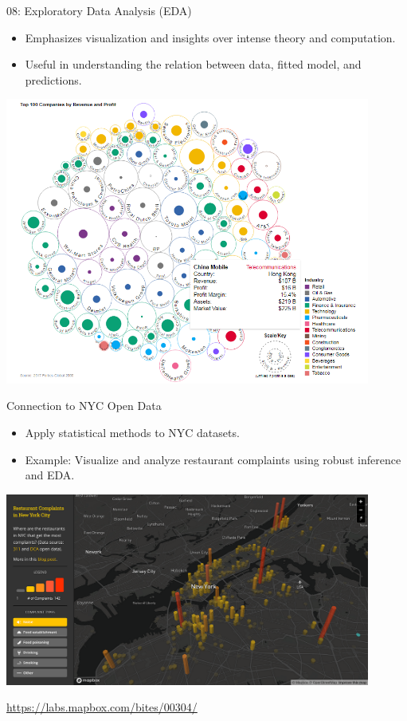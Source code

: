 \documentclass{beamer}
\begin{document}
\begin{frame}{08: Exploratory Data Analysis (EDA)}
\begin{itemize}
    \item Emphasizes visualization and insights over intense theory and computation.
    \item Useful in understanding the relation between data, fitted model, and predictions.
\end{itemize}

\includegraphics[width=0.9\textwidth]{bubble-chart.png}
\end{frame}

\begin{frame}{Connection to NYC Open Data}
\begin{itemize}
    \item Apply statistical methods to NYC datasets.
    \item Example: Visualize and analyze restaurant complaints using robust inference and EDA.
\end{itemize}

\begin{center}
  \includegraphics[width=0.9\textwidth]{nyc-open-data.png}
\end{center}

\begin{center}
    \small \url{https://labs.mapbox.com/bites/00304/}
\end{center}
\end{frame}
\end{document}
